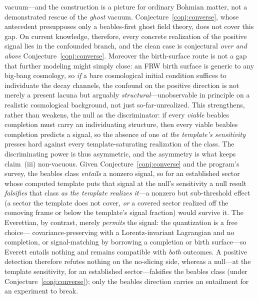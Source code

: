\documentclass[11pt]{article}
\theoremstyle{remark}
\begin{document}
vacuum---and the \cite{DGNSZ} construction is a picture for ordinary
Bohmian matter, not a demonstrated rescue of the \emph{ghost} vacuum.
Conjecture~\ref{conj:converse}, whose antecedent presupposes only a
beables-first ghost field theory, does not cover this gap. On current
knowledge, therefore, every concrete realization of the positive signal
lies in the confounded branch, and the clean case is conjectural
\emph{over and above} Conjecture~\ref{conj:converse}. Moreover the
birth-surface route is not a gap that further modeling might simply
close: an FRW birth surface is generic to any big-bang cosmology, so
\emph{if} a bare cosmological initial condition suffices to individuate
the decay channels, the confound on the positive direction is not
merely a present lacuna but arguably \emph{structural}---unobservable in
principle on a realistic cosmological background, not just
so-far-unrealized. This strengthens,
rather than weakens, the null as the discriminator: if every
\emph{viable} beables completion must carry an individuating structure,
then every viable beables completion predicts a signal, so the absence
of one \emph{at the template's sensitivity} presses hard against every
template-saturating realization of the class. The
discriminating power is thus asymmetric, and the asymmetry is what
keeps claim~(iii) non-vacuous. Given Conjecture~\ref{conj:converse} and
the program's survey, the beables class \emph{entails} a nonzero signal,
so for an established sector whose computed template puts that signal at
the null's sensitivity a null result \emph{falsifies} that class \emph{as
the template realizes it}---a nonzero but sub-threshold effect (a sector
the template does not cover, \emph{or} a covered sector realized off the
comoving frame or below the template's signal fraction) would survive it. The Everettian, by contrast,
merely \emph{permits} the signal: the quantization is a free choice---%
covariance-preserving with a Lorentz-invariant Lagrangian and no
completion, or signal-matching by borrowing a completion or birth
surface---so Everett entails nothing and remains compatible with
\emph{both} outcomes. A positive detection therefore refutes nothing on
the no-slicing side, whereas a null---at the template sensitivity, for an
established sector---falsifies the beables class (under
Conjecture~\ref{conj:converse}); only the beables direction carries an
entailment for an experiment to break.
\end{document}
